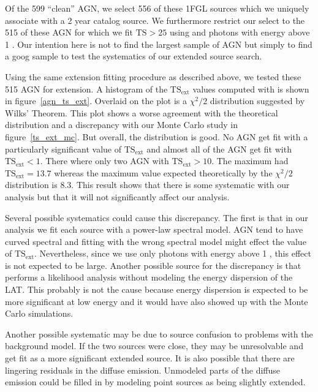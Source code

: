 \documentclass[12pt,preprint]{aastex}
\newcommand{\gev}{\text{GeV}\xspace}
\newcommand{\tsext}{{\ensuremath{\text{TS}_\text{ext}}}\xspace}
\newcommand{\ts}{\text{TS}\xspace}
\newcommand{\pointlike}{\text{\em pointlike}\xspace}
\begin{document}
Of the 599 ``clean'' AGN, we select 556 of these 1FGL sources which
we uniquely associate with a 2 year catalog source. We furthermore
restrict our select to the 515 of these AGN for which we fit $\ts>25$
using \pointlike and photons with energy above 1 \gev.  Our intention
here is not to find the largest sample of AGN but simply
to find a goog sample to test the systematics of our extended source
search.

Using the same extension fitting procedure as described above, we tested
these 515 AGN for extension. A histogram of the \tsext values computed
with \pointlike is shown in figure~\ref{agn_ts_ext}. Overlaid on the plot
is a $\chi^2/2$ distribution suggested by Wilks' Theorem.  This plot
shows a worse agreement with the theoretical distribution and
a discrepancy with 
our Monte Carlo study in figure~\ref{ts_ext_mc}.  But overall, the
distribution is good. No AGN get fit with a particularly significant
value of $\tsext$ and almost all of the AGN get fit with $\tsext<1$.
There where only two AGN with $\tsext>10$. The maximum had $\tsext=13.7$
whereas the maximum value expected theoretically by the $\chi^2/2$ distribution is
8.3. This result shows that there is some systematic with our
analysis but that it will not significantly affect our analysis.

Several possible systematics could cause this discrepancy. The first is
that in our analysis we fit each source with a power-law spectral model.
AGN tend to have curved spectral and fitting with the wrong spectral
model might effect the value of \tsext. Nevertheless, since we use only
photons with energy above 1 \gev, this effect is not expected to be large.
Another possible source for the discrepancy is that \pointlike performs
a likelihood analysis without modeling the energy dispersion of the LAT.
This probably is not the cause because energy dispersion is expected to
be more significant at low energy and it would have also showed up with
the Monte Carlo simulations.

Another possible systematic may be due to source confusion to problems
with the background model. If the two sources were close, they may
be unresolvable and get fit as a more significant extended source.
It is also possible that there are lingering residuals in the diffuse
emission. Unmodeled parts of the diffuse emission could be filled in by
modeling point sources as being slightly extended.
\end{document}
